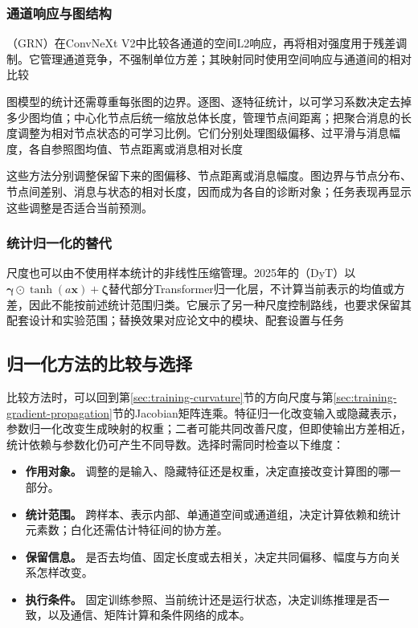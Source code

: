 \subsubsection{通道响应与图结构}
\label{sec:training-grn-qknorm}
\label{sec:training-graph-temporal-norm}
\label{sec:training-global-response-normalization}
（GRN）在ConvNeXt V2中比较各通道的空间L2响应，再将相对强度用于残差调制。它管理通道竞争，不强制单位方差；其映射同时使用空间响应与通道间的相对比较

图模型的统计还需尊重每张图的边界。逐图、逐特征统计，以可学习系数决定去掉多少图均值；中心化节点后统一缩放总体长度，管理节点间距离；把聚合消息的长度调整为相对节点状态的可学习比例。它们分别处理图级偏移、过平滑与消息幅度，各自参照图均值、节点距离或消息相对长度

这些方法分别调整保留下来的图偏移、节点距离或消息幅度。图边界与节点分布、节点间差别、消息与状态的相对长度，因而成为各自的诊断对象；任务表现再显示这些调整是否适合当前预测。

\subsubsection{统计归一化的替代}
\label{sec:training-normalization-substitutes}
尺度也可以由不使用样本统计的非线性压缩管理。2025年的（DyT）以$\bm\gamma\odot\tanh(a\bm x)+\bm\zeta$替代部分Transformer归一化层，不计算当前表示的均值或方差，因此不能按前述统计范围归类。它展示了另一种尺度控制路线，也要求保留其配套设计和实验范围；替换效果对应论文中的模块、配套设置与任务

\subsection{归一化方法的比较与选择}
\label{sec:training-normalization-comparison}
比较方法时，可以回到第\ref{sec:training-curvature}节的方向尺度与第\ref{sec:training-gradient-propagation}节的Jacobian矩阵连乘。特征归一化改变输入或隐藏表示，参数归一化改变生成映射的权重；二者可能共同改善尺度，但即使输出方差相近，统计依赖与参数化仍可产生不同导数。选择时需同时检查以下维度：
\begin{itemize}
  \item \textbf{作用对象。} 调整的是输入、隐藏特征还是权重，决定直接改变计算图的哪一部分。
  \item \textbf{统计范围。} 跨样本、表示内部、单通道空间或通道组，决定计算依赖和统计元素数；白化还需估计特征间的协方差。
  \item \textbf{保留信息。} 是否去均值、固定长度或去相关，决定共同偏移、幅度与方向关系怎样改变。
  \item \textbf{执行条件。} 固定训练参照、当前统计还是运行状态，决定训练推理是否一致，以及通信、矩阵计算和条件网络的成本。
\end{itemize}

